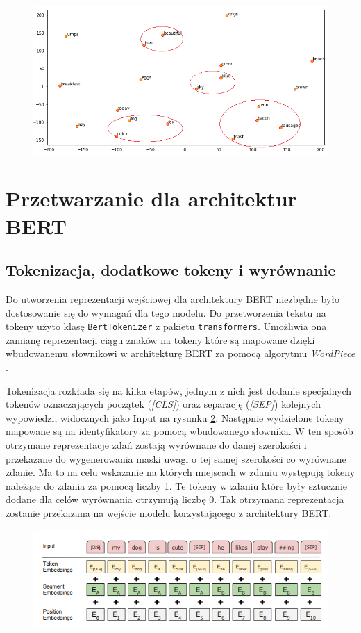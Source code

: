 \begin{figure}[t]
\centering\includegraphics[width=\textwidth]{figures/visualize_glove.png}
\label{rys:visualize_glove}
\end{figure}

\section{Przetwarzanie dla architektur BERT}

\subsection{Tokenizacja, dodatkowe tokeny i wyrównanie}

Do utworzenia reprezentacji wejściowej dla architektury BERT niezbędne było dostosowanie się do wymagań dla tego modelu. Do przetworzenia tekstu na tokeny użyto klasę \texttt{BertTokenizer} z pakietu \texttt{transformers}. Umożliwia ona zamianę reprezentacji ciągu znaków na tokeny które są mapowane dzięki wbudowanemu słownikowi w architekturę BERT za pomocą algorytmu \textit{WordPiece} \cite{wu2016googles}.

Tokenizacja rozkłada się na kilka etapów, jednym z nich jest dodanie specjalnych tokenów oznaczających początek (\textit{[CLS]}) oraz separację (\textit{[SEP]}) kolejnych wypowiedzi, widocznych jako Input na rysunku \ref{rys:bert_token}. Następnie wydzielone tokeny mapowane są na identyfikatory za pomocą wbudowanego słownika. W ten sposób otrzymane reprezentacje zdań zostają wyrównane do danej szerokości i przekazane do wygenerowania maski uwagi o tej samej szerokości co wyrównane zdanie. Ma to na celu wskazanie na których miejscach w zdaniu występują tokeny należące do zdania za pomocą liczby 1. Te tokeny w zdaniu które były sztucznie dodane dla celów wyrównania otrzymują liczbę 0. Tak otrzymana reprezentacja zostanie przekazana na wejście modelu korzystającego z architektury BERT.

\begin{figure}[t]
\centering\includegraphics[width=\textwidth]{figures/bert_token.png}
\label{rys:bert_token}
\end{figure}